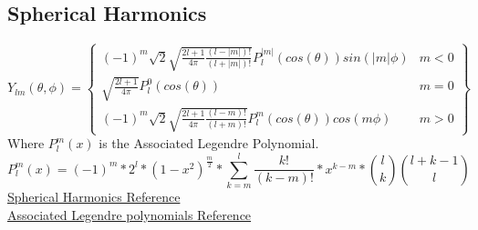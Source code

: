 \documentclass[12pt]{extarticle}
\theoremstyle{Definition}
\begin{document}
\subsection{Spherical Harmonics}
\[
Y_{lm} (\theta,\phi) = 
\begin{Bmatrix}
(-1)^m\sqrt{2}\sqrt{\frac{2l+1}{4\pi}\frac{(l-|m|)!}{(l+|m|)!}}P_l^{|m|}(cos(\theta)) sin(|m|\phi) & m < 0 \\
\sqrt{\frac{2l+1}{4\pi}}P_l^{0}(cos(\theta)) & m = 0 \\
(-1)^m\sqrt{2}\sqrt{\frac{2l+1}{4\pi}\frac{(l-m)!}{(l+m)!}}P_l^{m}(cos(\theta)) cos(m\phi) & m > 0 
\end{Bmatrix}
\]
Where $P_l^m(x)$ is the Associated Legendre Polynomial. \\ 
$$P_l^m(x) = (-1)^m*2^l*(1-x^2)^{\frac{m}{2}}*\sum_{k=m}^l\frac{k!}{(k-m)!}*x^{k-m}* \binom{l}{k}\binom{l+k-1}{l}$$
\href{https://en.wikipedia.org/wiki/Spherical_harmonics}{Spherical Harmonics Reference} \\ 
\href{https://en.wikipedia.org/wiki/Associated_Legendre_polynomials}{Associated Legendre polynomials Reference} \\ 
\end{document}
